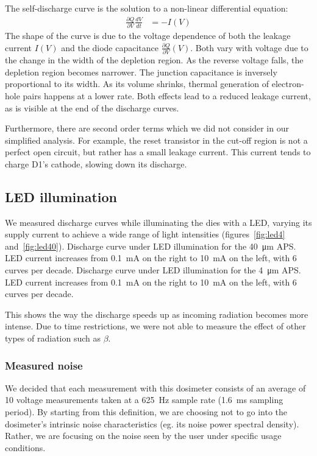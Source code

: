 The self-discharge curve is the solution to a non-linear differential equation:
\begin{align*}
    \frac{\partial Q}{\partial V}\frac{dV}{dt} &= -I(V)
\end{align*}
The shape of the curve is due to the voltage dependence of both 
the leakage current $I(V)$ 
and the diode capacitance $\frac{\partial Q}{\partial V}(V)$.
Both vary with voltage due to the change in the width of the depletion region.
As the reverse voltage falls,
the depletion region becomes narrower.
The junction capacitance is inversely proportional to its width.
As its volume shrinks,
thermal generation of electron-hole pairs happens at a lower rate.
Both effects lead to a reduced leakage current,
as is visible at the end of the discharge curves.

Furthermore, there are second order terms which we did not
consider in our simplified analysis.
For example,
the reset transistor in the cut-off region is not a perfect open circuit,
but rather has a small leakage current.
This current tends to charge D1's cathode,
slowing down its discharge.
%
\subsection{LED illumination}
We measured discharge curves while illuminating the dies with a LED,
varying its supply current to achieve a wide range of light intensities
(figures~\ref{fig:led4} and~\ref{fig:led40}).
{Discharge curve under LED illumination for the \SI{40}{\micro\meter} APS.
LED current increases from \SI{.1}{\milli\ampere} on the right to \SI{10}{\milli\ampere} on the left,
with 6 curves per decade.}
{Discharge curve under LED illumination for the \SI{4}{\micro\meter} APS.
LED current increases from \SI{.1}{\milli\ampere} on the right to \SI{10}{\milli\ampere} on the left,
with 6 curves per decade.}

This shows the way the discharge speeds up as incoming radiation becomes more intense.
Due to time restrictions, we were not able to measure the effect of other types of radiation
such as $\beta$.
\subsubsection{Measured noise}
We decided that each measurement with this dosimeter consists of 
an average of 10 voltage measurements taken at a \SI{625}{\hertz} sample rate
(\SI{1.6}{\milli\second} sampling period).
By starting from this definition,
we are choosing not to go into the dosimeter's intrinsic noise characteristics
(eg. its noise power spectral density).
Rather, we are focusing on the noise seen by the user under specific usage conditions.

